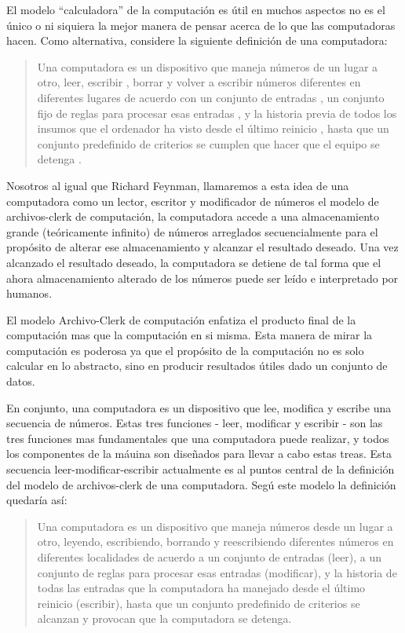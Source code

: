 \documentclass[12pt]{book}
\theoremstyle{definition}
\theoremstyle{remark}
\theoremstyle{plain}
\begin{document}
El modelo ``calculadora'' de la computación es útil en muchos aspectos no es el único o ni siquiera la mejor manera de pensar acerca de lo que las computadoras hacen. Como alternativa, considere la siguiente definición de una computadora:


\begin{quotation}
Una computadora es un dispositivo que maneja números de un lugar a otro, leer, escribir , borrar y volver a escribir números diferentes en diferentes lugares de acuerdo con un conjunto de entradas , un conjunto fijo de reglas para procesar esas entradas , y la historia previa de todos los insumos que el ordenador ha visto desde el último reinicio , hasta que un conjunto predefinido de criterios se cumplen que hacer que el equipo se detenga .

\end{quotation}



Nosotros al igual que Richard Feynman, llamaremos a esta idea de una computadora como un lector, escritor y modificador de números el modelo de archivos-clerk de computación, la computadora accede a una almacenamiento grande (teóricamente infinito) de números arreglados secuencialmente para el propósito de alterar ese almacenamiento y alcanzar el resultado deseado. Una vez alcanzado el resultado deseado, la computadora se detiene de tal forma que el ahora almacenamiento alterado de los números puede ser leído e interpretado por humanos.

El modelo Archivo-Clerk de computación enfatiza el producto final de la computación mas que la computación en si misma. Esta manera de mirar la computación es poderosa ya que el propósito de la computación no es solo calcular en lo abstracto, sino en producir resultados útiles dado un conjunto de datos.

En conjunto, una computadora es un dispositivo que lee, modifica y escribe una secuencia de números. Estas tres funciones - leer, modificar y escribir - son las tres funciones mas fundamentales que una computadora puede realizar, y todos los componentes de la máuina son diseñados para llevar a cabo estas treas. Esta secuencia leer-modificar-escribir actualmente es al puntos central de la definición del modelo de archivos-clerk de una computadora. Segú este modelo la definición quedaría así:



\begin{quotation}

Una computadora es un dispositivo que maneja números desde un lugar a otro, leyendo, escribiendo, borrando y reescribiendo diferentes números en diferentes localidades de acuerdo a un conjunto de entradas (leer), a un conjunto de reglas para procesar esas entradas (modificar), y la historia de todas las entradas que la computadora ha manejado desde el último reinicio (escribir), hasta que un conjunto predefinido de criterios se alcanzan y provocan que la computadora se detenga.


\end{quotation}
\end{document}
